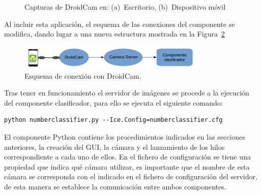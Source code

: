 \begin{figure}[H]
	\centering
	 \hspace{10pt}
	\caption{Capturas de DroidCam en: (a)~Escritorio, (b)~Dispositivo móvil}
	\label{fig.droid}
\end{figure}

Al incluir esta aplicación, el esquema de las conexiones del componente se modifica, dando lugar a una nueva estructura mostrada en la Figura~\ref{fig.esquemaDroid}

\begin{figure}[H]
	\centering
	\includegraphics[width=0.8\textwidth]{figures/esquemaDroid}
	\caption{Esquema de conexión con DroidCam.}
	\label{fig.esquemaDroid}
\end{figure}
\vspace{20pt}

Tras tener en funcionamiento el servidor de imágenes se procede a la ejecución del componente clasificador, para ello se ejecuta el siguiente comando:
\vspace{10pt}
\begin{lstlisting}[frame=single]
	python numberclassifier.py --Ice.Config=numberclassifier.cfg
\end{lstlisting}

El componente Python contiene los procedimientos indicados en las secciones anteriores, la creación del GUI, la cámara y el lanzamiento de los hilos correspondiente a cada uno de ellos. En el fichero de configuración se tiene una propiedad que indica qué cámara utilizar, es importante que el nombre de esta cámara se corresponda con el indicado en el fichero de configuración del servidor, de esta manera se establece la comunicación entre ambos componentes.\\


